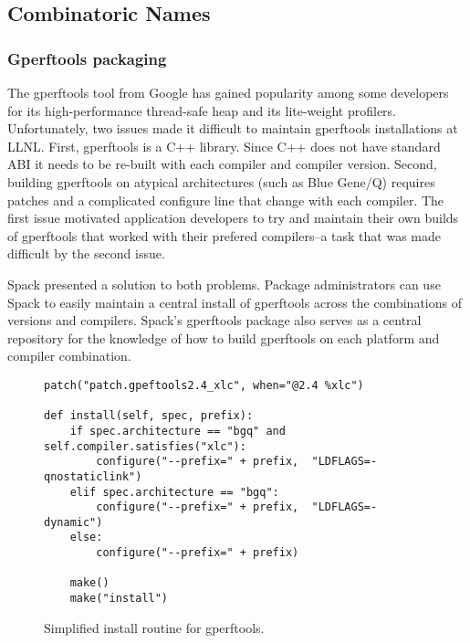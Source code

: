 
\subsection{Combinatoric Names}
\label{sec:usecase-combinatoric}


\subsubsection{Gperftools packaging}

The gperftools tool from Google has gained popularity among some developers for
its high-performance thread-safe heap and its lite-weight profilers.
Unfortunately, two issues made it difficult to maintain gperftools installations
at LLNL.  First, gperftools is a C++ library.  Since C++ does not have standard
ABI it needs to be re-built with each compiler and compiler version.  Second,
building gperftools on atypical architectures (such as Blue Gene/Q) requires
patches and a complicated configure line that change with each compiler.  The
first issue motivated application developers to try and maintain their own builds
of gperftools that worked with their prefered compilers--a task that was made
difficult by the second issue.

Spack presented a solution to both problems.  Package administrators can use Spack to
easily maintain a central install of gperftools across the combinations of versions
and compilers.  Spack's gperftools package also serves as a central repository for
the knowledge of how to build gperftools on each platform and compiler combination.

\begin{figure}
\begin{verbatim}
patch("patch.gpeftools2.4_xlc", when="@2.4 %xlc")

def install(self, spec, prefix):
    if spec.architecture == "bgq" and self.compiler.satisfies("xlc"):
        configure("--prefix=" + prefix,  "LDFLAGS=-qnostaticlink")
    elif spec.architecture == "bgq":
        configure("--prefix=" + prefix,  "LDFLAGS=-dynamic")
    else:
        configure("--prefix=" + prefix)

    make()
    make("install")
\end{verbatim}
  \caption{
    Simplified install routine for gperftools.
    \label{fig:gperftools}
  }
\end{figure}

